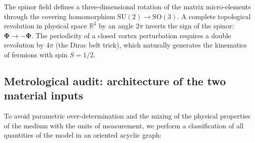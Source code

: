 \documentclass[11pt,a4paper]{article}
\theoremstyle{definition}
\theoremstyle{remark}
\begin{document}
The spinor field defines a three-dimensional rotation of the matrix micro-elements through the covering homomorphism $\mathrm{SU}(2) \to \mathrm{SO}(3)$. A complete topological revolution in physical space $\mathbb{R}^3$ by an angle $2\pi$ inverts the sign of the spinor: $\boldsymbol{\Phi} \to -\boldsymbol{\Phi}$. The periodicity of a closed vortex perturbation requires a double revolution by $4\pi$ (the Dirac belt trick), which naturally generates the kinematics of fermions with spin $S = 1/2$.
	
\subsection{Metrological audit: architecture of the two material inputs}
	
To avoid parametric over-determination and the mixing of the physical properties of the medium with the units of measurement, we perform a classification of all quantities of the model in an oriented acyclic graph:
	
\end{document}
